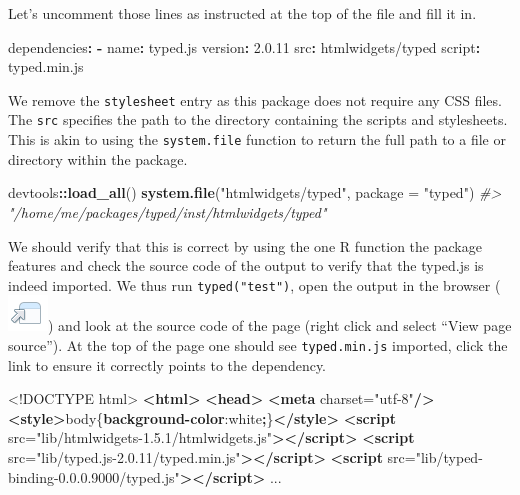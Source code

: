 \documentclass[
]{krantz}
\makeatletter
\newenvironment{Shaded}{\begin{snugshade}}{\end{snugshade}}
\newcommand{\AttributeTok}[1]{\textcolor[rgb]{0.61,0.61,0.61}{#1}}
\newcommand{\CommentTok}[1]{\textcolor[rgb]{0.37,0.37,0.37}{\textit{#1}}}
\newcommand{\ConstantTok}[1]{\textcolor[rgb]{0,0,0}{#1}}
\newcommand{\DataTypeTok}[1]{\textcolor[rgb]{0.27,0.27,0.27}{#1}}
\newcommand{\FloatTok}[1]{\textcolor[rgb]{0.06,0.06,0.06}{#1}}
\newcommand{\FunctionTok}[1]{\textcolor[rgb]{0,0,0}{#1}}
\newcommand{\KeywordTok}[1]{\textcolor[rgb]{0.27,0.27,0.27}{\textbf{#1}}}
\newcommand{\NormalTok}[1]{#1}
\newcommand{\OperatorTok}[1]{\textcolor[rgb]{0.43,0.43,0.43}{\textbf{#1}}}
\newcommand{\OtherTok}[1]{\textcolor[rgb]{0.37,0.37,0.37}{#1}}
\newcommand{\StringTok}[1]{\textcolor[rgb]{0.5,0.5,0.5}{#1}}
\newenvironment{kframe}{%
\medskip{}
\setlength{\fboxsep}{.8em}
 \def\at@end@of@kframe{}%
 \ifinner\ifhmode%
  \def\at@end@of@kframe{\end{minipage}}%
  \begin{minipage}{\columnwidth}%
 \fi\fi%
 \def\FrameCommand##1{\hskip\@totalleftmargin \hskip-\fboxsep
 \colorbox{shadecolor}{##1}\hskip-\fboxsep
     \hskip-\linewidth \hskip-\@totalleftmargin \hskip\columnwidth}%
 \MakeFramed {\advance\hsize-\width
   \@totalleftmargin\z@ \linewidth\hsize
   \@setminipage}}%
 {\par\unskip\endMakeFramed%
 \at@end@of@kframe}
\renewenvironment{Shaded}{\begin{kframe}}{\end{kframe}}
\makeatother
\begin{document}
Let's uncomment those lines as instructed at the top of the file and fill it in.

\begin{Shaded}
\begin{Highlighting}[]
\FunctionTok{dependencies}\KeywordTok{:}
\AttributeTok{  }\KeywordTok{{-}}\AttributeTok{ }\FunctionTok{name}\KeywordTok{:}\AttributeTok{ typed.js}
\AttributeTok{    }\FunctionTok{version}\KeywordTok{:}\AttributeTok{ }\FloatTok{2.0.11}
\AttributeTok{    }\FunctionTok{src}\KeywordTok{:}\AttributeTok{ htmlwidgets/typed}
\AttributeTok{    }\FunctionTok{script}\KeywordTok{:}\AttributeTok{ typed.min.js}
\end{Highlighting}
\end{Shaded}

We remove the \texttt{stylesheet} entry as this package does not require any CSS files. The \texttt{src} specifies the path to the directory containing the scripts and stylesheets. This is akin to using the \texttt{system.file} function to return the full path to a file or directory within the package.

\begin{Shaded}
\begin{Highlighting}[]
\NormalTok{devtools}\OperatorTok{::}\KeywordTok{load\_all}\NormalTok{()}
\KeywordTok{system.file}\NormalTok{(}\StringTok{"htmlwidgets/typed"}\NormalTok{, }\DataTypeTok{package =} \StringTok{"typed"}\NormalTok{)                                         }
\CommentTok{\#> "/home/me/packages/typed/inst/htmlwidgets/typed"}
\end{Highlighting}
\end{Shaded}

We should verify that this is correct by using the one R function the package features and check the source code of the output to verify that the typed.js is indeed imported. We thus run \texttt{typed("test")}, open the output in the browser (\includegraphics{images/open-in-browser.png}) and look at the source code of the page (right click and select ``View page source''). At the top of the page one should see \texttt{typed.min.js} imported, click the link to ensure it correctly points to the dependency.

\begin{Shaded}
\begin{Highlighting}[]
\DataTypeTok{<!DOCTYPE }\NormalTok{html}\DataTypeTok{>}
\KeywordTok{<html>}
\KeywordTok{<head>}
\KeywordTok{<meta}\OtherTok{ charset=}\StringTok{"utf{-}8"}\KeywordTok{/>}
\KeywordTok{<style>}\NormalTok{body\{}\KeywordTok{background{-}color}\NormalTok{:}\ConstantTok{white}\OperatorTok{;}\NormalTok{\}}\KeywordTok{</style>}
\KeywordTok{<script}\OtherTok{ src=}\StringTok{"lib/htmlwidgets{-}1.5.1/htmlwidgets.js"}\KeywordTok{></script>}
\KeywordTok{<script}\OtherTok{ src=}\StringTok{"lib/typed.js{-}2.0.11/typed.min.js"}\KeywordTok{></script>}
\KeywordTok{<script}\OtherTok{ src=}\StringTok{"lib/typed{-}binding{-}0.0.0.9000/typed.js"}\KeywordTok{></script>}
\NormalTok{...}
\end{Highlighting}
\end{Shaded}
\end{document}
